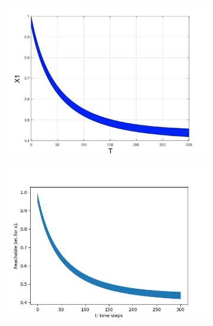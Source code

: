 \documentclass[EPiC]{easychair}
\begin{document}
\begin{figure}[h]
    \hspace{-12ex}
    \begin{subfigure}{0.6\textwidth}
    \centering
    \includegraphics[width=1.2\textwidth]{SapoFigures/LV/SapoLV_X1.jpg}
    \end{subfigure}
    \begin{subfigure}{0.6\textwidth}
    \centering
    \includegraphics[width=1.14\textwidth]{SapoFigures/LV/KaaLV_X1.png}
    \end{subfigure}
    

\end{figure}
\end{document}

